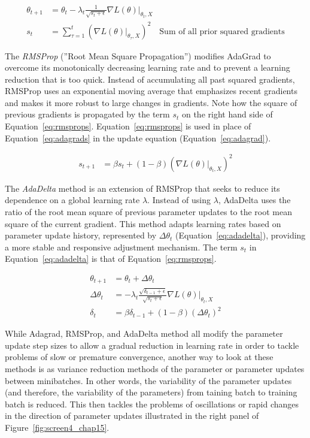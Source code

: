 \begin{align}
\theta_{t+1} &= \theta_t - \lambda_t \frac{1}{\sqrt{s_t + \epsilon}}\nabla L(\theta) \rvert_{\theta_t, X} \label{eq:adagrad} \\
s_t &= \sum_{\tau=1}^t \left( \nabla L(\theta)\rvert_{\theta_\tau, X}\right)^2 \quad \text{Sum of all prior squared gradients} \label{eq:adagrads}
\end{align}

The \emph{RMSProp} (''Root Mean Square Propagation'') modifies AdaGrad to overcome its monotonically decreasing learning rate and to prevent a learning reduction that is too quick. Instead of accumulating all past squared gradients, RMSProp uses an exponential moving average that emphasizes recent gradients and makes it more robust to large changes in gradients. Note how the square of previous gradients is propagated by the term $s_t$ on the right hand side of Equation~\ref{eq:rmsprops}. Equation~\ref{eq:rmsprops} is used in place of Equation~\ref{eq:adagrads} in the update equation (Equation~\ref{eq:adagrad}).

\begin{align}
s_{t+1} &= \beta s_t + (1-\beta) \left( \nabla L(\theta)\rvert_{\theta_t, X}\right)^2 \label{eq:rmsprops}
\end{align}

The \emph{AdaDelta} method is an extension of RMSProp that seeks to reduce its dependence on a global learning rate $\lambda$. Instead of using $\lambda$, AdaDelta uses the ratio of the root mean square of previous parameter updates to the root mean square of the current gradient. This method adapts learning rates based on parameter update history, represented by $\Delta\theta_t$ (Equation~\ref{eq:adadelta}), providing a more stable and responsive adjustment mechanism. The term $s_t$ in Equation~\ref{eq:adadelta} is that of Equation~\ref{eq:rmsprops}.

\begin{align}
\theta_{t+1} &= \theta_t + \Delta\theta_t \nonumber \\
\Delta\theta_{t} &= - \lambda_t \frac{\sqrt{\delta_{t-1} + \epsilon}}{\sqrt{s_t + \epsilon}} \nabla L(\theta) \rvert_{\theta_t, X} \label{eq:adadelta} \\
\delta_t &= \beta \delta_{t-1} + (1-\beta) (\Delta\theta_t)^2 \nonumber
\end{align}

While Adagrad, RMSProp, and AdaDelta method all modify the parameter update step sizes to allow a gradual reduction in learning rate in order to tackle problems of slow or premature convergence, another way to look at these methods is as variance reduction methods of the parameter or parameter updates between minibatches. In other words, the variability of the parameter updates (and therefore, the variability of the parameters) from taining batch to training batch is reduced. This then tackles the problems of oscillations or rapid changes in the direction of parameter updates illustrated in the right panel of Figure~\ref{fig:screen4_chap15}.

